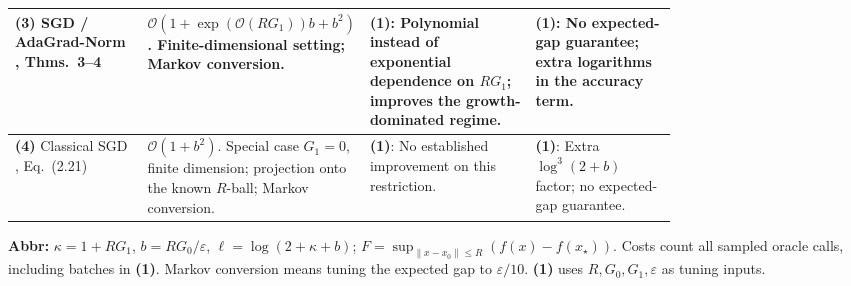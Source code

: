 \begin{table}[tp]
\begin{threeparttable}
\begin{tabularx}{\linewidth}{@{}>{\raggedright\arraybackslash}p{0.20\linewidth}>{\raggedright\arraybackslash}p{0.32\linewidth}>{\raggedright\arraybackslash}p{0.25\linewidth}>{\raggedright\arraybackslash}X@{}}
\textbf{(3)} SGD / AdaGrad-Norm \citep{sglcKovalev2026v2}, Thms.~3--4 & $\mathcal{O}(1+\exp(\mathcal{O}(RG_1))b+b^2)$.
Finite-dimensional setting; Markov conversion. & \textbf{(1)}: Polynomial instead of exponential dependence on $RG_1$; improves the growth-dominated regime. & \textbf{(1)}: No expected-gap guarantee; extra logarithms in the accuracy term. \\
\midrule
\textbf{(4)} Classical SGD \citep{sglcNemirovski2009}, Eq.~(2.21) & $\mathcal{O}(1+b^2)$.
Special case $G_1=0$, finite dimension; projection onto the known $R$-ball; Markov conversion. & \textbf{(1)}: No established improvement on this restriction. & \textbf{(1)}: Extra $\log^3(2+b)$ factor; no expected-gap guarantee. \\
\bottomrule
\end{tabularx}
\begin{tablenotes}[flushleft]\footnotesize
\item[] \textbf{Abbr:} $\kappa=1+RG_1$, $b=RG_0/\varepsilon$, $\ell=\log(2+\kappa+b)$; $F=\sup_{\|x-x_0\|\le R}(f(x)-f(x_\star))$. Costs count all sampled oracle calls, including batches in \textbf{(1)}. Markov conversion means tuning the expected gap to $\varepsilon/10$. \textbf{(1)} uses $R,G_0,G_1,\varepsilon$ as tuning inputs.
\end{tablenotes}
\end{threeparttable}
\end{table}
\clearpage
